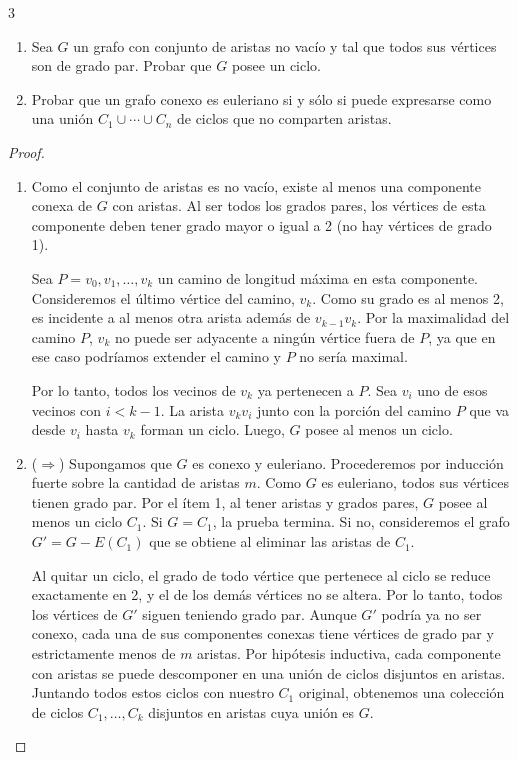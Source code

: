 \vspace{0.5cm}

\begin{ejercicioEntregar}{3}
    \begin{enumerate}
        \item Sea \( G \) un grafo con conjunto de aristas no vacío y tal que todos sus vértices son de grado par. Probar que \( G \) posee un ciclo.
        \item Probar que un grafo conexo es euleriano si y sólo si puede expresarse como una unión \( C_1 \cup \cdots \cup C_n \) de ciclos que no comparten aristas.
    \end{enumerate}
\end{ejercicioEntregar}
\begin{proof}
    \begin{enumerate}
        \item Como el conjunto de aristas es no vacío, existe al menos una componente conexa de \(G\) con aristas. Al ser todos los grados pares, los vértices de esta componente deben tener grado mayor o igual a 2 (no hay vértices de grado 1).

              Sea \(P = v_0, v_1, \ldots, v_k\) un camino de longitud máxima en esta componente. Consideremos el último vértice del camino, \(v_k\). Como su grado es al menos 2, es incidente a al menos otra arista además de \(v_{k-1}v_k\). Por la maximalidad del camino \(P\), \(v_k\) no puede ser adyacente a ningún vértice fuera de \(P\), ya que en ese caso podríamos extender el camino y \(P\) no sería maximal.

              Por lo tanto, todos los vecinos de \(v_k\) ya pertenecen a \(P\). Sea \(v_i\) uno de esos vecinos con \(i < k-1\). La arista \(v_k v_i\) junto con la porción del camino \(P\) que va desde \(v_i\) hasta \(v_k\) forman un ciclo. Luego, \(G\) posee al menos un ciclo.

        \item (\( \Longrightarrow \)) Supongamos que \(G\) es conexo y euleriano. Procederemos por inducción fuerte sobre la cantidad de aristas \(m\).
              Como \(G\) es euleriano, todos sus vértices tienen grado par. Por el ítem 1, al tener aristas y grados pares, \(G\) posee al menos un ciclo \(C_1\).
              Si \(G = C_1\), la prueba termina. Si no, consideremos el grafo \(G' = G - E(C_1)\) que se obtiene al eliminar las aristas de \(C_1\).

              Al quitar un ciclo, el grado de todo vértice que pertenece al ciclo se reduce exactamente en 2, y el de los demás vértices no se altera. Por lo tanto, todos los vértices de \(G'\) siguen teniendo grado par. Aunque \(G'\) podría ya no ser conexo, cada una de sus componentes conexas tiene vértices de grado par y estrictamente menos de \(m\) aristas. Por hipótesis inductiva, cada componente con aristas se puede descomponer en una unión de ciclos disjuntos en aristas. Juntando todos estos ciclos con nuestro \(C_1\) original, obtenemos una colección de ciclos \(C_1, \ldots, C_k\) disjuntos en aristas cuya unión es \(G\).


\end{enumerate}
\end{proof}
